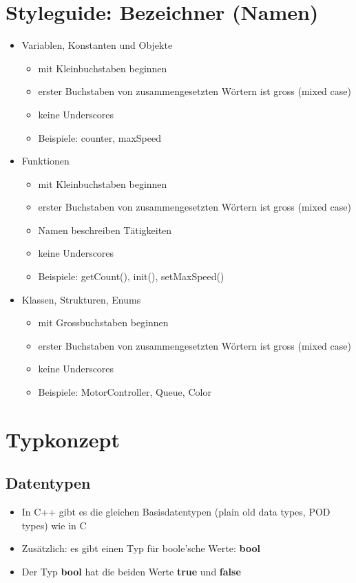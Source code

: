 \section{Styleguide: Bezeichner (\raisebox{-0.9ex}{\~{ }}Namen)}
\begin{itemize}
	\item Variablen, Konstanten und Objekte
	\begin{itemize}
		\item mit Kleinbuchstaben beginnen
		\item erster Buchstaben von zusammengesetzten Wörtern ist gross (mixed case)
		\item keine Underscores
		\\
		\item[\-] Beispiele: counter, maxSpeed
	\end{itemize}
	\vspace{\baselineskip}
	\item Funktionen
	\begin{itemize}
		\item mit Kleinbuchstaben beginnen
		\item erster Buchstaben von zusammengesetzten Wörtern ist gross (mixed case)
		\item Namen beschreiben Tätigkeiten
		\item keine Underscores
		\\
		\item[\-] Beispiele: getCount(), init(), setMaxSpeed()
	\end{itemize}
	\vspace{\baselineskip}
	\item Klassen, Strukturen, Enums
	\begin{itemize}
		\item mit Grossbuchstaben beginnen
		\item erster Buchstaben von zusammengesetzten Wörtern ist gross (mixed case)
		\item keine Underscores
		\\
		\item[\-] Beispiele: MotorController, Queue, Color
	\end{itemize}
\end{itemize}

\section{Typkonzept}

\subsection{Datentypen}
\begin{itemize}
	\item In C++ gibt es die gleichen Basisdatentypen (plain old data types, POD types) wie in C
	\item Zusätzlich: es gibt einen Typ für boole'sche Werte: \textbf{bool}
	\item Der Typ \textbf{bool} hat die beiden Werte \textbf{true} und \textbf{false}
\end{itemize}

